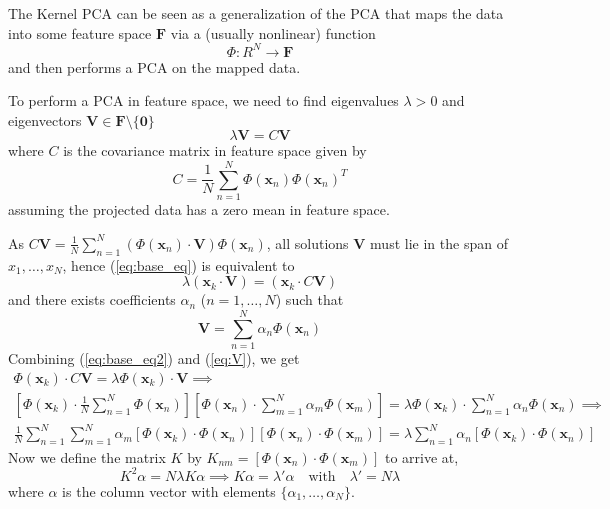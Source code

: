 \documentclass[12pt]{article}
\newcommand{\F}{\mathbf{F}}
\newcommand{\V}{\mathbf{V}}
\newcommand{\x}{\mathbf{x}}
\begin{document}
The Kernel PCA can be seen as a generalization of the PCA that maps the data
into some feature space $\mathbf{F}$ via a (usually nonlinear) function
$$\Phi:R^N \to \F$$ and then performs a PCA on the mapped data.

To perform a PCA in feature space, we need to find eigenvalues $\lambda > 0$
and eigenvectors $\mathbf{V} \in \mathbf{F\setminus\{0\}}$
\begin{equation}
    \lambda\V = C\V
\end{equation}
where $C$ is the covariance matrix in feature space given by
\begin{equation}
    C = \frac{1}{N}\sum_{n=1}^{N}\Phi(\x_n)\Phi(\x_n)^T \label{eq:base_eq}
\end{equation}
assuming the projected data has a zero mean in feature space. 

As $C\V = \frac{1}{N}\sum_{n=1}^{N}(\Phi(\x_n)\cdot\V)\Phi(\x_n)$, all
solutions $\V$ must lie in the span of $x_1,\dots,x_N$, hence
(\ref{eq:base_eq}) is equivalent to
\begin{equation}
    \lambda(\x_k \cdot \V) = (\x_k \cdot C\V) \label{eq:base_eq2}
\end{equation}
and there exists coefficients $\alpha_n$ ($n=1,\dots, N$) such that
\begin{equation}
    \V = \sum_{n=1}^{N}\alpha_n\Phi(\x_n) \label{eq:V}
\end{equation}
Combining (\ref{eq:base_eq2}) and (\ref{eq:V}), we get
\begin{gather*}
    \Phi(\x_k) \cdot C \V = \lambda \Phi(\x_k) \cdot \V \implies\\ 
    [\Phi(\x_k) \cdot \frac{1}{N}\sum_{n=1}^{N}\Phi(\x_n)][\Phi(\x_n) \cdot \sum_{m=1}^{N}\alpha_m\Phi(\x_m)] = \lambda \Phi(\x_k) \cdot \sum_{n=1}^{N}\alpha_n \Phi(\x_n) \implies\\
     \frac{1}{N}\sum_{n=1}^{N}\sum_{m=1}^{N}\alpha_m[\Phi(\x_k) \cdot \Phi(\x_n)][\Phi(\x_n) \cdot \Phi(\x_m)] = \lambda \sum_{n=1}^{N}\alpha_n [\Phi(\x_k) \cdot \Phi(\x_n)]
\end{gather*}
Now we define the matrix $K$ by $K_{nm} = [\Phi(\x_n) \cdot \Phi(\x_m)]$ to arrive at,
\begin{equation}
    K^2 \alpha=N \lambda K \alpha \implies K \alpha = \lambda'\alpha \quad\text{with}\quad \lambda' = N \lambda
\end{equation}
where $\alpha$ is the column vector with elements $\{\alpha_1, \dots, \alpha_N\}$.
\end{document}
